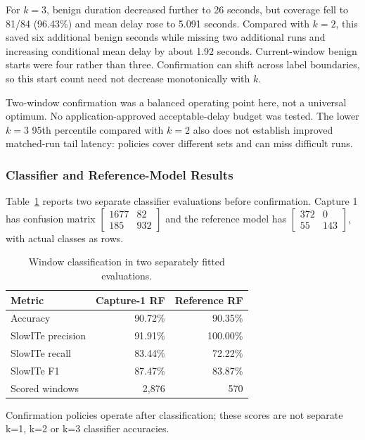 \documentclass[conference]{IEEEtran}
\begin{document}
For $k=3$, benign duration decreased further to 26 seconds, but coverage
fell to 81/84 (96.43\%) and mean delay rose to 5.091 seconds. Compared
with $k=2$, this saved six additional benign seconds while missing two
additional runs and increasing conditional mean delay by about
1.92 seconds. Current-window benign starts were four rather than
three. Confirmation can shift across label boundaries, so this start
count need not decrease monotonically with $k$.

Two-window confirmation was a balanced operating point here, not a
universal optimum. No application-approved acceptable-delay budget
was tested. The lower $k=3$ 95th percentile compared with $k=2$ also
does not establish improved matched-run tail latency: policies cover
different sets and can miss difficult runs.

\subsubsection{Classifier and Reference-Model Results}

Table~\ref{tab:classification} reports two separate classifier
evaluations before confirmation. Capture 1 has confusion matrix
$[\begin{smallmatrix}1677&82\\185&932\end{smallmatrix}]$ and the
reference model has
$[\begin{smallmatrix}372&0\\55&143\end{smallmatrix}]$, with actual
classes as rows. 

\begin{table}[t]
\centering
\caption{Window classification in two separately fitted evaluations.}
\label{tab:classification}
\begin{tabularx}{\columnwidth}{Xrr}
\toprule
Metric & Capture-1 RF & Reference RF \\
\midrule
Accuracy & 90.72\% & 90.35\% \\
SlowITe precision & 91.91\% & 100.00\% \\
SlowITe recall & 83.44\% & 72.22\% \\
SlowITe F1 & 87.47\% & 83.87\% \\
Scored windows & 2,876 & 570 \\
\bottomrule
\end{tabularx}
\smallskip
\parbox{\columnwidth}{\footnotesize Confirmation policies operate after classification; these scores are not separate k=1, k=2 or k=3 classifier accuracies.}
\end{table}
\end{document}
